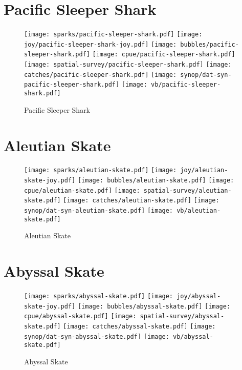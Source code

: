 \section{Pacific Sleeper Shark}

\begin{figure}[htbp]
\centering
\texttt{[image: sparks/pacific-sleeper-shark.pdf]}
\texttt{[image: joy/pacific-sleeper-shark-joy.pdf]}
\texttt{[image: bubbles/pacific-sleeper-shark.pdf]}
\texttt{[image: cpue/pacific-sleeper-shark.pdf]}
\texttt{[image: spatial-survey/pacific-sleeper-shark.pdf]}
\texttt{[image: catches/pacific-sleeper-shark.pdf]}
\texttt{[image: synop/dat-syn-pacific-sleeper-shark.pdf]}
\texttt{[image: vb/pacific-sleeper-shark.pdf]}
\caption{Pacific Sleeper Shark}
\end{figure}
\clearpage
\section{Aleutian Skate}

\begin{figure}[htbp]
\centering
\texttt{[image: sparks/aleutian-skate.pdf]}
\texttt{[image: joy/aleutian-skate-joy.pdf]}
\texttt{[image: bubbles/aleutian-skate.pdf]}
\texttt{[image: cpue/aleutian-skate.pdf]}
\texttt{[image: spatial-survey/aleutian-skate.pdf]}
\texttt{[image: catches/aleutian-skate.pdf]}
\texttt{[image: synop/dat-syn-aleutian-skate.pdf]}
\texttt{[image: vb/aleutian-skate.pdf]}
\caption{Aleutian Skate}
\end{figure}
\clearpage
\section{Abyssal Skate}

\begin{figure}[htbp]
\centering
\texttt{[image: sparks/abyssal-skate.pdf]}
\texttt{[image: joy/abyssal-skate-joy.pdf]}
\texttt{[image: bubbles/abyssal-skate.pdf]}
\texttt{[image: cpue/abyssal-skate.pdf]}
\texttt{[image: spatial-survey/abyssal-skate.pdf]}
\texttt{[image: catches/abyssal-skate.pdf]}
\texttt{[image: synop/dat-syn-abyssal-skate.pdf]}
\texttt{[image: vb/abyssal-skate.pdf]}
\caption{Abyssal Skate}
\end{figure}
\clearpage
